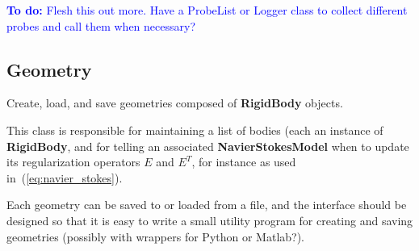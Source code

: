 \documentclass[11pt]{article}
\def\todo#1{\textcolor{blue}{{\bf To do:} #1}}
\def\class#1{{\bf #1}} %
\begin{document}
\todo{Flesh this out more.  Have a ProbeList or Logger class to collect different probes and call them when necessary?}

\subsection{Geometry}
Create, load, and save geometries composed of \class{RigidBody} objects.

This class is responsible for maintaining a list of bodies (each an instance of \class{RigidBody}, and for telling an associated \class{NavierStokesModel} when to update its regularization operators $E$ and $E^T$, for instance as used in~(\ref{eq:navier_stokes}).

Each geometry can be saved to or loaded from a file, and the interface should be designed so that it is easy to write a small utility program for creating and saving geometries (possibly with wrappers for Python or Matlab?).  
\end{document}
